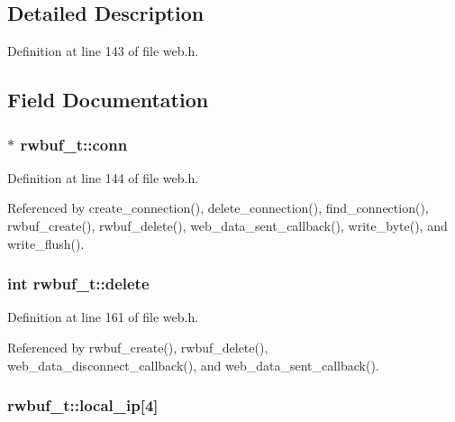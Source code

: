 \subsection{Detailed Description}


Definition at line 143 of file web.\-h.



\subsection{Field Documentation}
\hypertarget{structrwbuf__t_a15785240e32c27f7af7c4b0cb1a6e39b}{
\subsubsection[{conn}]{$\ast$ rwbuf\-\_\-t\-::conn}}\label{structrwbuf__t_a15785240e32c27f7af7c4b0cb1a6e39b}


Definition at line 144 of file web.\-h.



Referenced by create\-\_\-connection(), delete\-\_\-connection(), find\-\_\-connection(), rwbuf\-\_\-create(), rwbuf\-\_\-delete(), web\-\_\-data\-\_\-sent\-\_\-callback(), write\-\_\-byte(), and write\-\_\-flush().

\hypertarget{structrwbuf__t_a54e278f96a331cf0a61d22094c4b9f87}{
\subsubsection[{delete}]{\setlength{\rightskip}{0pt plus 5cm}int rwbuf\-\_\-t\-::delete}}\label{structrwbuf__t_a54e278f96a331cf0a61d22094c4b9f87}


Definition at line 161 of file web.\-h.



Referenced by rwbuf\-\_\-create(), rwbuf\-\_\-delete(), web\-\_\-data\-\_\-disconnect\-\_\-callback(), and web\-\_\-data\-\_\-sent\-\_\-callback().

\hypertarget{structrwbuf__t_aa26b4813db79aeaa293bb1eadfde0b54}{
\subsubsection[{local\-\_\-ip}]{ rwbuf\-\_\-t\-::local\-\_\-ip\mbox{[}4\mbox{]}}}\label{structrwbuf__t_aa26b4813db79aeaa293bb1eadfde0b54}


